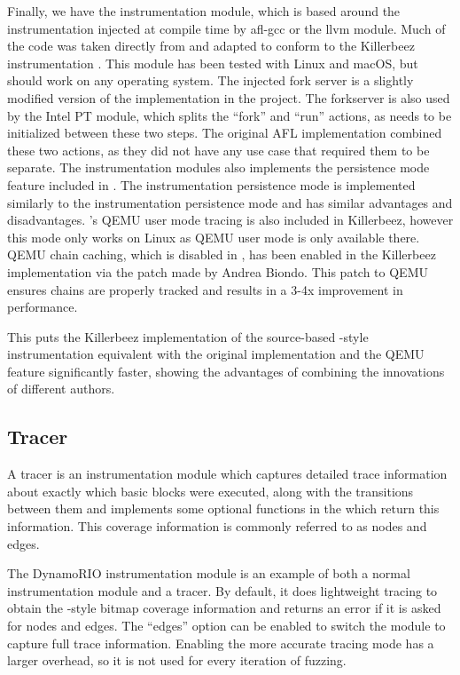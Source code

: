 Finally, we have the \AFL{} instrumentation module, which is based around the
instrumentation injected at compile time by afl-gcc or the \AFL{}
llvm module. Much of the code was taken directly from \AFL{} and adapted to
conform to the Killerbeez instrumentation \API{}. This module has been tested
with Linux and macOS, but should work on any \POSIX{} operating system.
The injected fork server is a slightly modified version of the
implementation in the \AFL{} project. The forkserver is also used by the
Intel PT module, which splits the ``fork'' and ``run'' actions, as \IPT{} needs
to be initialized between these two steps.  The original AFL implementation
combined these two actions, as they did not have any use case that required
them to be separate.  The \AFL{} instrumentation modules also
implements the persistence mode feature
included in \AFL{}.  The \AFL{} instrumentation persistence mode is implemented
similarly to the \IPT{} instrumentation persistence mode and has similar
advantages and disadvantages. \AFL{}'s QEMU user mode tracing is also included in Killerbeez,
however this mode only works on Linux as QEMU user mode is only
available there.  QEMU chain caching, which is disabled in \AFL{},
has been enabled in the Killerbeez implementation via the patch made by Andrea Biondo.\cite{qemuspeedup} This patch
to QEMU ensures chains are properly tracked and results in a 3-4x improvement
in performance.

This puts the Killerbeez implementation of the source-based \AFL{}-style
instrumentation equivalent with the original implementation and the QEMU
feature significantly faster, showing the advantages of combining the
innovations of different authors.

\subsection{Tracer} \label{Tracer}
A tracer is an instrumentation module which captures detailed trace
information about exactly which basic blocks were executed, along with the
transitions between them and implements some optional functions in the \API{}
which return this information.  This coverage information is commonly referred
to as nodes and edges.

The DynamoRIO instrumentation module is an example of both a normal
instrumentation module and a tracer. By default, it does lightweight tracing to
obtain the \AFL{}-style bitmap coverage information and returns an error if it
is asked for nodes and edges. The ``edges'' option can be enabled to
switch the module to capture full trace information.
Enabling the more accurate tracing mode has a larger overhead, so it is not
used for every iteration of fuzzing.


